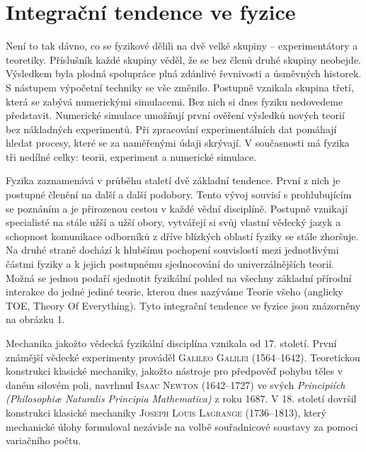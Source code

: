   \section{Integrační tendence ve fyzice}\label{fyz:IchapIIsecVIII}
    Není to tak dávno, co se fyzikové dělili na dvě velké skupiny – experimentátory a teoretiky.
    Příslušník každé skupiny věděl, že se bez členů druhé skupiny neobejde. Výsledkem byla plodná
    spolupráce plná zdánlivé řevnivosti a úsměvných historek. S nástupem výpočetní techniky se vše
    změnilo. Postupně vznikala skupina třetí, která se zabývá numerickými simulacemi. Bez nich si
    dnes fyziku nedovedeme představit. Numerické simulace umožňují první ověření výsledků nových
    teorií bez nákladných experimentů. Při zpracování experimentálních dat pomáhají hledat procesy,
    které se za naměřenými údaji skrývají. V současnosti má fyzika tři nedílné celky: teorii,
    experiment a numerické simulace. 
    
    Fyzika zaznamenává v průběhu staletí dvě základní tendence. První z nich je postupné členění na
    další a další podobory. Tento vývoj souvisí s prohlubujícím se poznáním a je přirozenou cestou v
    každé vědní disciplíně. Postupně vznikají specialisté na stále užší a užší obory, vytvářejí si
    svůj vlastní vědecký jazyk a schopnost komunikace odborníků z dříve blízkých oblastí fyziky se
    stále zhoršuje. Na druhé straně dochází k hlubšímu pochopení souvislostí mezi jednotlivými
    částmi fyziky a k jejich postupnému sjednocování do univerzálnějších teorií. Možná se jednou
    podaří sjednotit fyzikální pohled na všechny základní přírodní interakce do jedné jediné teorie,
    kterou dnes nazýváme Teorie všeho (anglicky TOE, Theory Of Everything). Tyto integrační tendence
    ve fyzice jsou znázorněny na obrázku 1. 

    
    Mechanika jakožto vědecká fyzikální disciplína vznikala od 17. století. První známější vědecké
    experimenty prováděl \textsc{Galileo Galilei} (1564–1642). Teoretickou konstrukci klasické
    mechaniky, jakožto nástroje pro předpověď pohybu těles v daném silovém poli, navrhnul
    \textsc{Isaac Newton} (1642–1727) ve svých \emph{Principiích (Philosophiæ Naturalis Principia
    Mathematica)} z roku 1687. V 18. století dovršil konstrukci klasické mechaniky \textsc{Joseph
    Louis Lagrange} (1736–1813), který mechanické úlohy formuloval nezávisle na volbě souřadnicové
    soustavy za pomoci variačního počtu.
    
